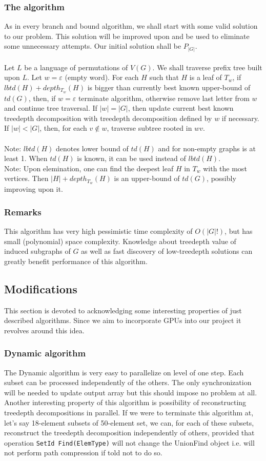 \subsubsection{The algorithm}
As in every branch and bound algorithm, we shall start with some valid solution to our problem. This solution will be improved upon and be used to eliminate some unnecessary attempts. Our initial solution shall be $P_{\left|G\right|}$.\\\\
Let $L$ be a language of permutations of $V\left(G\right)$. We shall traverse prefix tree built upon $L$.
Let $w=\varepsilon$ (empty word). For each $H$ such that $H$ is a leaf of $T_w$, if $lbtd(H)+depth_{T_w}(H)$ is bigger than currently best known upper-bound of $td(G)$, then, if $w=\varepsilon$ terminate algorithm, otherwise remove last letter from $w$ and continue tree traversal. If $|w|=|G|$, then update current best known treedepth decomposition with treedepth decomposition defined by $w$ if necessary. If $|w|<|G|$, then, for each $v\notin w$, traverse subtree rooted in $wv$.\\\\
Note: $lbtd(H)$ denotes lower bound of $td\left(H\right)$ and for non-empty graphs is at least 1. When $td\left(H\right)$ is known, it can be used instead of $lbtd(H)$.\\
Note: Upon elemination, one can find the deepest leaf $H$ in $T_w$ with the most vertices. Then $\left|H\right| + depth_{T_w}(H)$ is an upper-bound of $td(G)$, possibly improving upon it.
\subsubsection{Remarks}
This algorithm has very high pessimistic time complexity of $O\left(\left|G\right|!\right)$, but has small (polynomial) space complexity. Knowledge about treedepth value of induced subgraphs of $G$ as well as fast discovery of low-treedepth solutions can greatly benefit performance of this algorithm.
\subsection{Modifications}
This section is devoted to acknowledging some interesting properties of just described algorithms. Since we aim to incorporate GPUs into our project it revolves around this idea.
\subsubsection{Dynamic algorithm}
The Dynamic algorithm is very easy to parallelize on level of one step. Each subset can be processed independently of the others. The only synchronization will be needed to update output array but this should impose no problem at all. Another interesting property of this algorithm is possibility of reconstructing treedepth decompositions in parallel. If we were to terminate this algorithm at, let's say 18-element subsets of 50-element set, we can, for each of these subsets, reconstruct the treedepth decomposition independently of others, provided that operation \texttt{SetId Find(ElemType)} will not change the UnionFind object i.e. will not perform path compression if told not to do so.
